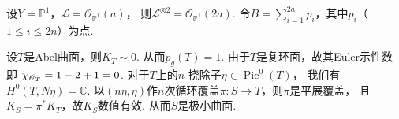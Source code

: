\begin{example}
    设$Y = \mathbb{P}^{1}$，$\mathscr{L} = \mathscr{O}_{\mathbb{P}^{1}}(a)$，
    则$\mathscr{L}^{\otimes 2} = \mathscr{O}_{\mathbb{P}^{1}}(2a)$.
    令$B = \sum_{i=1}^{2a}p_{i}$，其中$p_{i}$（$1 \leq i \leq 2n$）为点. 
\end{example}

\begin{example}
    设$T$是Abel曲面，则$K_{T} \sim 0$. 从而$p_{g}(T) = 1$. 
    由于$T$是复环面，故其Euler示性数即
    $\chi_{\mathscr{O}_{T}} = 1 - 2 + 1 = 0$.
    对于$T$上的$n$-挠除子$\eta \in \operatorname{Pic}^{0}(T)$，
    我们有$H^{0}(T,N\eta) = \mathbb{C}$.
    以$(n\eta,\eta)$作$n$次循环覆盖$\pi:S \to T$，则$\pi$是平展覆盖，
    且$K_{S} = \pi^{*}K_{T}$，故$K_{S}$数值有效. 从而$S$是极小曲面.
    

\end{example}